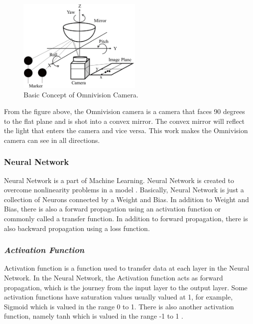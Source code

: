 \begin{figure}[ht]
  \centering
  \includegraphics[width=6cm]{gambar/omnivision3.jpg}
  \caption{Basic Concept of Omnivision Camera.}
  \label{fig:omnivision3}
\end{figure}

From the figure above, the Omnivision camera is a camera that faces 90 degrees to the flat plane and is shot into a convex mirror. The convex mirror will reflect the light that enters the camera and vice versa. This work makes the Omnivision camera can see in all directions.

\subsubsection{Neural Network}
\label{sec:nn}
  
  

Neural Network is a part of Machine Learning. Neural Network is created to overcome nonlinearity problems in a model \citet{ref_neural_network}. Basically, Neural Network is just a collection of Neurons connected by a Weight and Bias. In addition to Weight and Bias, there is also a forward propagation using an activation function or commonly called a transfer function. In addition to forward propagation, there is also backward propagation using a loss function.

\subsubsection{\emph{Activation Function}}
\label{sec:activation_function}

Activation function is a function used to transfer data at each layer in the Neural Network. In the Neural Network, the Activation function acts as forward propagation, which is the journey from the input layer to the output layer. Some activation functions have saturation values usually valued at 1, for example, Sigmoid which is valued in the range 0 to 1. There is also another activation function, namely tanh which is valued in the range -1 to 1 \citet{ref_activation_function}.

